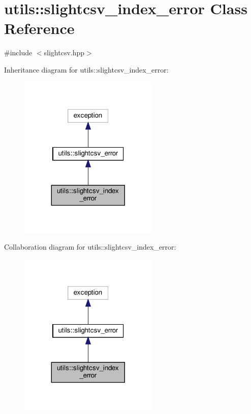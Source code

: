 \hypertarget{classutils_1_1slightcsv__index__error}{}\section{utils\+:\+:slightcsv\+\_\+index\+\_\+error Class Reference}
\label{classutils_1_1slightcsv__index__error}


{\ttfamily \#include $<$slightcsv.\+hpp$>$}



Inheritance diagram for utils\+:\+:slightcsv\+\_\+index\+\_\+error\+:\nopagebreak
\begin{figure}[H]
\begin{center}
\leavevmode
\includegraphics[width=188pt]{classutils_1_1slightcsv__index__error__inherit__graph}
\end{center}
\end{figure}


Collaboration diagram for utils\+:\+:slightcsv\+\_\+index\+\_\+error\+:\nopagebreak
\begin{figure}[H]
\begin{center}
\leavevmode
\includegraphics[width=188pt]{classutils_1_1slightcsv__index__error__coll__graph}
\end{center}
\end{figure}


